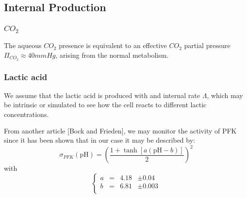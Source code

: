\documentclass{revtex4}
\begin{document}
\subsection{Internal Production}

\subsubsection{$CO_2$}
The aqueous $CO_2$ presence is equivalent to an effective $CO_2$ partial pressure $\Pi_{CO_2}\approx 40mmHg$,
arising from the normal metabolism.

\subsubsection{Lactic acid}
We assume that the lactic acid is produced with and internal rate $\Lambda$, which may be
intrinsic or simulated to see how the cell reacts to different lactic concentrations.

From another article [Bock and Frieden], we may monitor the activity of PFK since it has
been shown that in our case it may be described by:
\begin{equation}
\sigma_{PFK}\left(\mathrm{pH}\right)  = \left(\dfrac{1+\tanh\left[ a \left(\mathrm{pH}-b\right)\right] }{2}\right)^2
\end{equation}
with
\begin{equation}
	\left\lbrace
	\begin{array}{rcll}
	a & = & 4.18 & \pm 0.04\\
	b & = & 6.81 & \pm 0.003\\
	\end{array}
	\right.
\end{equation}
\end{document}
